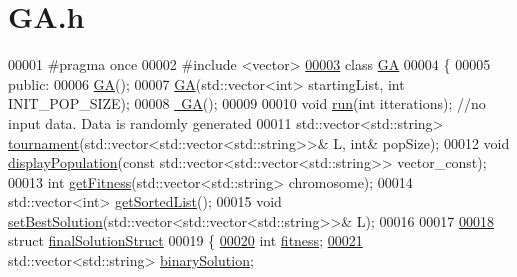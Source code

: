 \hypertarget{_g_a_8h_source}{}\section{G\+A.\+h}
\label{_g_a_8h_source}

\begin{DoxyCode}
00001 \textcolor{preprocessor}{#pragma once}
00002 \textcolor{preprocessor}{#include <vector>}
\hypertarget{_g_a_8h_source_l00003}{}\hyperlink{class_g_a}{00003} \textcolor{keyword}{class }\hyperlink{class_g_a}{GA}
00004 \{
00005 \textcolor{keyword}{public}:
00006     \hyperlink{class_g_a_a754149f21a0440f8078abb48f1c88ef3}{GA}();
00007     \hyperlink{class_g_a_a754149f21a0440f8078abb48f1c88ef3}{GA}(std::vector<int> startingList, \textcolor{keywordtype}{int} INIT\_POP\_SIZE);
00008     \hyperlink{class_g_a_a18975e5b8b24b68b2d783ae3080845c9}{~GA}();
00009 
00010     \textcolor{keywordtype}{void} \hyperlink{class_g_a_a4828dadbded41199cb54fc71daf4bd44}{run}(\textcolor{keywordtype}{int} itterations); \textcolor{comment}{//no input data. Data is randomly generated}
00011     std::vector<std::string> \hyperlink{class_g_a_a6bd43faf13978fc5ea9ed305523288d6}{tournament}(std::vector<std::vector<std::string>>& L, \textcolor{keywordtype}{int}& popSize);
00012     \textcolor{keywordtype}{void} \hyperlink{class_g_a_a3dd11c58a07b6d73b7eeaed2821ac762}{displayPopulation}(\textcolor{keyword}{const} std::vector<std::vector<std::string>> vector\_const);
00013     \textcolor{keywordtype}{int} \hyperlink{class_g_a_a1410614c7bc1e10f428039e95b5056bc}{getFitness}(std::vector<std::string> chromosome);
00014     std::vector<int> \hyperlink{class_g_a_aae44c594b59257c78ea06d1811cfef98}{getSortedList}();
00015     \textcolor{keywordtype}{void} \hyperlink{class_g_a_a7456fb3da49960949c9e4fce3939182a}{setBestSolution}(std::vector<std::vector<std::string>>& L);
00016 
00017 
\hypertarget{_g_a_8h_source_l00018}{}\hyperlink{struct_g_a_1_1final_solution_struct}{00018}     \textcolor{keyword}{struct }\hyperlink{struct_g_a_1_1final_solution_struct}{finalSolutionStruct}
00019     \{
\hypertarget{_g_a_8h_source_l00020}{}\hyperlink{struct_g_a_1_1final_solution_struct_a3e55cdb1b7562714b90b82ca66ad983a}{00020}         \textcolor{keywordtype}{int} \hyperlink{struct_g_a_1_1final_solution_struct_a3e55cdb1b7562714b90b82ca66ad983a}{fitness};
\hypertarget{_g_a_8h_source_l00021}{}\hyperlink{struct_g_a_1_1final_solution_struct_a1af467f3eb53235e34bafbec5d7866e2}{00021}         std::vector<std::string> \hyperlink{struct_g_a_1_1final_solution_struct_a1af467f3eb53235e34bafbec5d7866e2}{binarySolution};

\end{DoxyCode}
